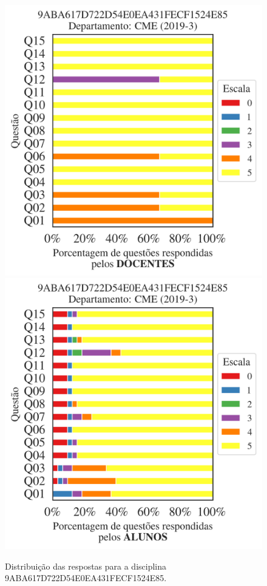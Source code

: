 \documentclass[a4paper,10pt]{article}
\begin{document}
\begin{figure}[h]
\centering
\includegraphics[width=0.485\linewidth]{analise_disciplina_departamento_CME_9ABA617D722D54E0EA431FECF1524E85_docentes.png}
\includegraphics[width=0.485\linewidth]{analise_disciplina_departamento_CME_9ABA617D722D54E0EA431FECF1524E85_alunos.png}
\caption{\label{fig:analise_geral_departamento}                Distribuição das respostas para a disciplina 9ABA617D722D54E0EA431FECF1524E85. }
\end{figure}
\end{document}

